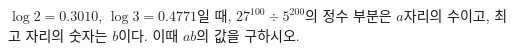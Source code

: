 $\log 2=0.3010$, $\log 3=0.4771$일 때, $27^{100}\div 5^{200}$의 정수 부분은 $a$자리의 수이고, 최고 자리의 숫자는 $b$이다. 이때 $ab$의 값을 구하시오.
